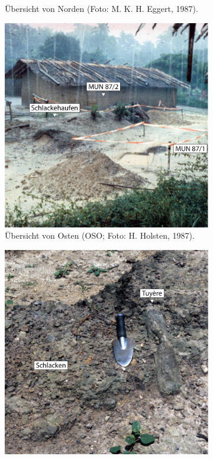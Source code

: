 \begin{figure}[!tb]
\begin{subfigure}[t]{\columnwidth}
 \caption{Übersicht von Norden (Foto: M. K. H. Eggert, 1987).}
 \label{fig:MUN87_Übersicht2}
 \end{subfigure}\vspace{1em}
 \begin{subfigure}[t]{\columnwidth}
 \centering
 \includegraphics[width = \textwidth]{fig/MUN87_HH87-IV-9-II.pdf}
 \caption{Übersicht von Osten (OSO; Foto: H. Holsten, 1987).}
 \label{fig:MUN87_Übersicht3}
 \end{subfigure}\hfill
 \begin{subfigure}[t]{\columnwidth}
 \centering
 \includegraphics[width = \textwidth]{fig/MUN87-101_E87-035-35.pdf}

\end{subfigure}
\end{figure}
